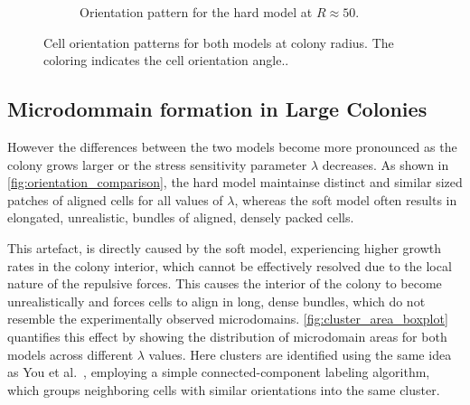\documentclass[conference]{IEEEtran}
\begin{document}
\begin{figure}[H]
\begin{subfigure}[b]{0.49\columnwidth}
        \caption{Orientation pattern for the hard model at $R \approx 50$.}
    \end{subfigure}
    \caption{Cell orientation patterns for both models at colony radius. The coloring indicates the cell orientation angle..}
    \label{fig:orientation_comparison_small}
\end{figure}

\subsection{Microdommain formation in Large Colonies}

However the differences between the two models become more pronounced as the colony grows larger or the stress sensitivity parameter $\lambda$ decreases. As shown in \autoref{fig:orientation_comparison}, the hard model maintainse distinct and similar sized patches of aligned cells for all values of $\lambda$, whereas the soft model often results in elongated, unrealistic, bundles of aligned, densely packed cells.

This artefact, is directly caused by the soft model, experiencing higher growth rates in the colony interior, which cannot be effectively resolved due to the local nature of the repulsive forces. This causes the interior of the colony to become unrealistically and forces cells to align in long, dense bundles, which do not resemble the experimentally observed microdomains. \autoref{fig:cluster_area_boxplot} quantifies this effect by showing the distribution of microdomain areas for both models across different $\lambda$ values. Here clusters are identified using the same idea as You et al.~\cite{You2018}, employing a simple connected-component labeling algorithm, which groups neighboring cells with similar orientations into the same cluster.
\end{document}
